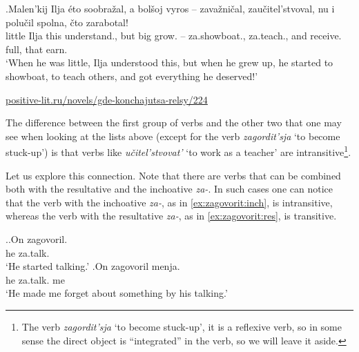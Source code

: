 \exg.\label{ex:zateach}Malen'kij Ilja \'eto soobra\v{z}al, a bol\v{s}oj vyros -- zava\v{z}ni\v{c}al, zau\v{c}itel'stvoval, nu i polu\v{c}il spolna, \v{c}to zarabotal!\\
little Ilja this understand., but big grow. -- za.showboat., za.teach., {} and receive. full, that earn.\\
\vspace{0.5em}
`When he was little, Ilja understood this, but when he grew up, he started to showboat, to teach others, and got everything he deserved!'
\begin{flushright}
\vspace{-0.5em}
\url{positive-lit.ru/novels/gde-konchajutsa-relsy/224}
\end{flushright}

The difference between the first group of verbs and the other two that one may see when looking at the lists above (except for the verb \textit{zagordit'sja} `to become stuck-up') is that verbs like \textit{u\v{c}itel'stvovat'} `to work as a teacher' are intransitive\footnote{The verb \textit{zagordit'sja} `to become stuck-up', it is a reflexive verb, so in some sense the direct object is ``integrated'' in the verb, so we will leave it aside.}. 

Let us explore this connection. Note that there are verbs that can be combined both with the resultative and the inchoative \textit{za-}. In such cases one can notice that the verb with the inchoative \textit{za-}, as in \ref{ex:zagovorit:inch}, is intransitive, whereas the verb with the resultative \textit{za-}, as in \ref{ex:zagovorit:res}, is transitive.

\ex.\ag.\label{ex:zagovorit:inch}On zagovoril.\\
he za.talk.\\
\vspace{0.5em}
`He started talking.'
\bg.\label{ex:zagovorit:res}On zagovoril menja.\\
he za.talk. me\\
\vspace{0.5em}
`He made me forget about something by his talking.'
 
